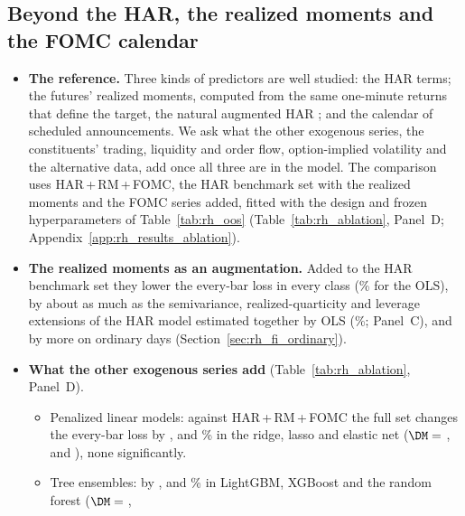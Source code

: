 \subsection{Beyond the HAR, the realized moments and the FOMC calendar}
\label{sec:rh_results_beyond}
\label{sec:rh_results_bench}
\begin{itemize}
\item \textbf{The reference.} Three kinds of predictors are well studied: the HAR terms; the futures' realized moments,
  computed from the same one-minute returns that define the target, the natural augmented HAR
  \citep[e.g.][]{PattonSheppard2015,BollerslevPattonQuaedvlieg2016,CorsiReno2012}; and the calendar of scheduled
  announcements. We ask what the other exogenous series, the constituents' trading, liquidity and order flow,
  option-implied volatility and the alternative data, add once all three are in the model. The comparison uses
  HAR\,+\,RM\,+\,FOMC, the HAR benchmark set with the realized moments and the FOMC series added, fitted with the
  design and frozen hyperparameters of Table~\ref{tab:rh_oos} (Table~\ref{tab:rh_ablation}, Panel~D;
  Appendix~\ref{app:rh_results_ablation}).
\item \textbf{The realized moments as an augmentation.} Added to the HAR benchmark set they lower the every-bar loss in
  every class (\rhabOlsAddRmAllPct\% for the OLS), by about as much as the semivariance, realized-quarticity and
  leverage extensions of the HAR model estimated together by OLS (\rhabOlsSharqlAllPct\%; Panel~C), and by more on
  ordinary days (Section~\ref{sec:rh_fi_ordinary}).
\item \textbf{What the other exogenous series add} (Table~\ref{tab:rh_ablation}, Panel~D).
  \begin{itemize}
  \item Penalized linear models: against HAR\,+\,RM\,+\,FOMC the full set changes the every-bar loss by
    \rhabRidgeFullVsAddRmFomcAllPct, \rhabLassoFullVsAddRmFomcAllPct{} and \rhabEnetFullVsAddRmFomcAllPct\% in the
    ridge, lasso and elastic net ($\DM={}$\rhabRidgeFullVsAddRmFomcAllDm, \rhabLassoFullVsAddRmFomcAllDm{} and
    \rhabEnetFullVsAddRmFomcAllDm), none significantly.
  \item Tree ensembles: by \rhabLgbmFullVsAddRmFomcAllPct, \rhabXgbFullVsAddRmFomcAllPct{} and
    \rhabRfFullVsAddRmFomcAllPct\% in LightGBM, XGBoost and the random forest ($\DM={}$\rhabLgbmFullVsAddRmFomcAllDm,

\end{itemize}
\end{itemize}

